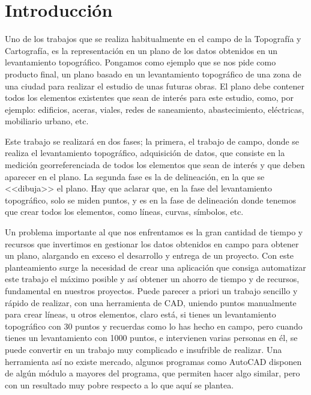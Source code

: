 \section{Introducción}
Uno de los trabajos que se realiza habitualmente en el campo de la Topografía y Cartografía, es la representación en un plano de los datos obtenidos en un levantamiento topográfico. Pongamos como ejemplo que se nos pide como producto final, un plano basado en un levantamiento topográfico de una zona de una ciudad para realizar el estudio de unas futuras obras. El plano debe contener todos los elementos existentes que sean de interés para este estudio, como, por ejemplo: edificios, aceras, viales, redes de saneamiento, abastecimiento, eléctricas, mobiliario urbano, etc.

Este trabajo se realizará en dos fases; la primera, el trabajo de campo, donde se realiza el levantamiento topográfico, adquisición de datos, que consiste en la medición georreferenciada de todos los elementos que sean de interés y que deben aparecer en el plano. La segunda fase es la de delineación, en la que se <<dibuja>> el plano. Hay que aclarar que, en la fase del levantamiento topográfico, solo se miden puntos, y es en la fase de delineación donde tenemos que crear todos los elementos, como líneas, curvas, símbolos, etc.   

Un problema importante al que nos enfrentamos es la gran cantidad de tiempo y recursos que invertimos en gestionar los datos obtenidos en campo para obtener un plano, alargando en exceso el desarrollo y entrega de un proyecto.
Con este planteamiento surge la necesidad de crear una aplicación que consiga automatizar este trabajo el máximo posible y así obtener un ahorro de tiempo y de recursos, fundamental en nuestros proyectos.
Puede parecer a priori un trabajo sencillo y rápido de realizar, con una herramienta de CAD, uniendo puntos manualmente para crear líneas, u otros elementos, claro está, si tienes un levantamiento topográfico con 30 puntos y recuerdas como lo has hecho en campo, pero cuando tienes un levantamiento con 1000 puntos, e intervienen varias personas en él, se puede convertir en un trabajo muy complicado e insufrible de realizar.
Una herramienta así no existe mercado, algunos programas como AutoCAD disponen de algún módulo a mayores del programa, que permiten hacer algo similar, pero con un resultado muy pobre respecto a lo que aquí se plantea.

